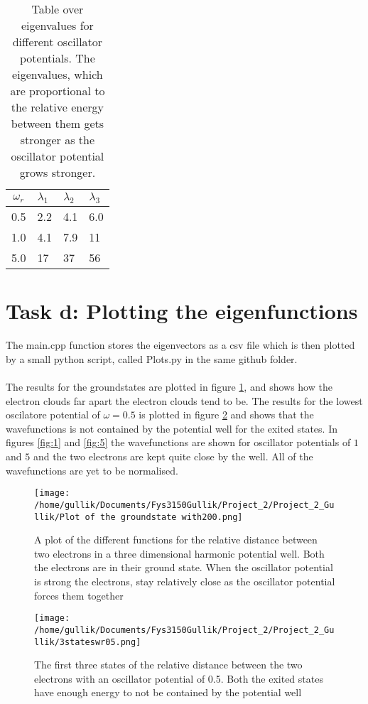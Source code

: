 \documentclass[11pt,a4wide]{article}
\begin{document}
		\begin{table}
			\begin{tabular}{c || l | l | l}
			\hline
			\(\omega_r\) &	\(\lambda_1\) & \(\lambda_2\) & \(\lambda_3\)
			\\ \hline
			0.5			&	2.2		&		4.1			&	6.0
			\\ \hline
			1.0			&	4.1		&		7.9			&	11
			\\ \hline	
			5.0 		&	17		&		37		&	56
			\end{tabular}
			\caption{Table over eigenvalues for different oscillator potentials. The eigenvalues, which are proportional to the 
			relative energy between them gets stronger as the oscillator potential grows stronger.}
			\label{table:Oscillator_pot}
		\end{table}

	\section{Task d: Plotting the eigenfunctions}
	
	The main.cpp function stores the eigenvectors as a csv file which is then plotted by a small python script, called Plots.py in the same github folder.
	\\ \\
	The results for the groundstates are plotted in figure \ref{fig:wavefunctions}, and shows how the electron clouds far apart the electron clouds tend to be.
	The results for the lowest oscilatore potential of \(\omega = 0.5\) is plotted in figure \ref{fig:0_5} and shows that the wavefunctions is not
	contained by the potential well for the exited states. In figures \ref{fig:1} and \ref{fig:5} the wavefunctions are shown for oscillator 
	potentials of \(1\) and \( 5\) and the two electrons are kept quite close by the well.  All of the wavefunctions are yet to be normalised.
	
	\begin{figure}
		\texttt{[image: /home/gullik/Documents/Fys3150Gullik/Project\_2/Project\_2\_Gullik/Plot of the groundstate with200.png]}
		\label{fig:wavefunctions}
		\caption{A plot of the different functions for the relative distance between two electrons in a three dimensional harmonic potential well.
		Both the electrons are in their ground state. When the oscillator potential is strong the electrons, stay relatively close as the oscillator
		potential forces them together}
	\end{figure}
	
	\begin{figure}
		\texttt{[image: /home/gullik/Documents/Fys3150Gullik/Project\_2/Project\_2\_Gullik/3stateswr05.png]}
		\caption{The first three states of the relative distance between the two electrons with an oscillator potential of 0.5. 
		Both the exited states have enough energy to not be contained by the potential well}
		\label{fig:0_5}
	\end{figure}
	
\end{document}
